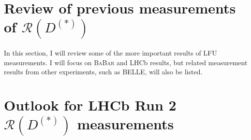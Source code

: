 \documentclass[12pt,letterpaper]{article}
\newcommand{\PRLrule}{
    \bigskip
    \noindent\makebox[\linewidth]{
        \resizebox{0.3333\linewidth}{1pt}{$\blacklozenge$}
    }
    \bigskip
}
\def\BaBar/{\textsc{BaBar}}
\def\RDDst/{\ensuremath{\mathcal{R}(D^{(*)})}}
\begin{document}



\section{Review of previous measurements of \RDDst/}
In this section, I will review some of the more important results of LFU
measurements.
I will focus on \BaBar/ and LHCb results, but related measurement results from
other experiments, such as BELLE, will also be listed.





\section{Outlook for LHCb Run 2 \RDDst/ measurements}


\PRLrule
\printbibliography
\end{document}
